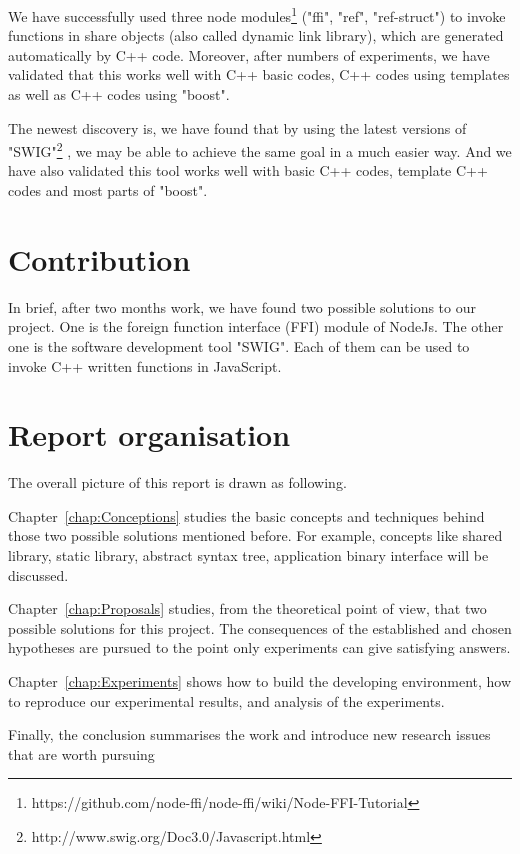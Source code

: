 We have successfully used three node modules\footnote{https://github.com/node-ffi/node-ffi/wiki/Node-FFI-Tutorial} ("ffi", "ref", "ref-struct") to invoke functions in share objects (also called dynamic link library), which are generated automatically by C++ code. Moreover, after numbers of experiments, we have validated that this works well with C++ basic codes, C++ codes using templates as well as C++ codes using "boost".  

The newest discovery is, we have found that by using the latest versions of "SWIG"\footnote{http://www.swig.org/Doc3.0/Javascript.html} , we may be able to achieve the same goal in a much easier way. And we have also validated this tool works well with basic C++ codes, template C++ codes and most parts of "boost".

\section{Contribution}

In brief, after two months work, we have found two possible solutions to our project. One is the foreign function interface (FFI) module of NodeJs. The other one is the software development tool "SWIG". Each of them can be used to invoke C++ written functions in JavaScript.  

\section{Report organisation}

The overall picture of this report is drawn as following.

Chapter~\ref{chap:Conceptions} studies the basic concepts and techniques behind those two possible solutions mentioned before. For example, concepts like shared library, static library, abstract syntax tree, application binary interface will be discussed. 

Chapter~\ref{chap:Proposals} studies, from the theoretical point of view, that two possible solutions for this project. The consequences of the established and chosen hypotheses are pursued to the point only experiments can give satisfying answers.

Chapter~\ref{chap:Experiments} shows how to build the developing environment, how to reproduce our experimental results, and analysis of the experiments.

Finally, the conclusion summarises the work and introduce new research issues that are worth pursuing

